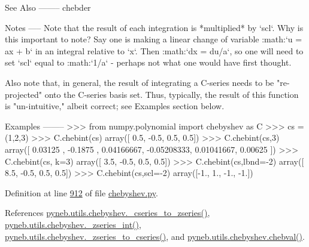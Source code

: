\begin{DoxyVerb}
See Also
--------
chebder

Notes
-----
Note that the result of each integration is *multiplied* by `scl`.
Why is this important to note?  Say one is making a linear change of
variable :math:`u = ax + b` in an integral relative to `x`.  Then
:math:`dx = du/a`, so one will need to set `scl` equal to :math:`1/a`
- perhaps not what one would have first thought.

Also note that, in general, the result of integrating a C-series needs
to be "re-projected" onto the C-series basis set.  Thus, typically,
the result of this function is "un-intuitive," albeit correct; see
Examples section below.

Examples
--------
>>> from numpy.polynomial import chebyshev as C
>>> cs = (1,2,3)
>>> C.chebint(cs)
array([ 0.5, -0.5,  0.5,  0.5])
>>> C.chebint(cs,3)
array([ 0.03125   , -0.1875    ,  0.04166667, -0.05208333,  0.01041667,
        0.00625   ])
>>> C.chebint(cs, k=3)
array([ 3.5, -0.5,  0.5,  0.5])
>>> C.chebint(cs,lbnd=-2)
array([ 8.5, -0.5,  0.5,  0.5])
>>> C.chebint(cs,scl=-2)
array([-1.,  1., -1., -1.])\end{DoxyVerb}
 

Definition at line \hyperlink{chebyshev_8py_source_l00912}{912} of file \hyperlink{chebyshev_8py_source}{chebyshev.\+py}.



References \hyperlink{chebyshev_8py_source_l00100}{pyneb.\+utils.\+chebyshev.\+\_\+cseries\+\_\+to\+\_\+zseries()}, \hyperlink{chebyshev_8py_source_l00271}{pyneb.\+utils.\+chebyshev.\+\_\+zseries\+\_\+int()}, \hyperlink{chebyshev_8py_source_l00124}{pyneb.\+utils.\+chebyshev.\+\_\+zseries\+\_\+to\+\_\+cseries()}, and \hyperlink{chebyshev_8py_source_l01018}{pyneb.\+utils.\+chebyshev.\+chebval()}.


